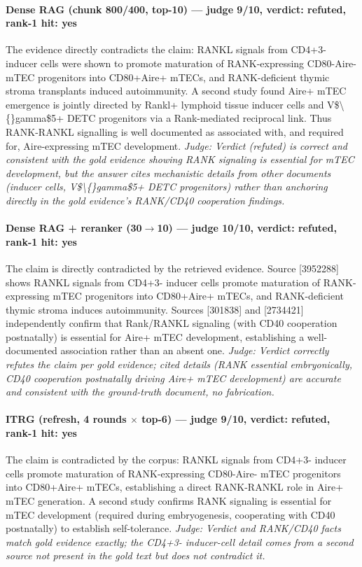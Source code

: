 \documentclass[sigconf, review, anonymous]{acmart}
\begin{document}
\paragraph{Dense RAG (chunk 800/400, top-10) --- judge 9/10, verdict: refuted, rank-1 hit: yes}
\noindent The evidence directly contradicts the claim: RANKL signals from CD4+3- inducer cells were shown to promote maturation of RANK-expressing CD80-Aire- mTEC progenitors into CD80+Aire+ mTECs, and RANK-deficient thymic stroma transplants induced autoimmunity. A second study found Aire+ mTEC emergence is jointly directed by Rankl+ lymphoid tissue inducer cells and V\$\textbackslash\{\}gamma\$5+ DETC progenitors via a Rank-mediated reciprocal link. Thus RANK-RANKL signalling is well documented as associated with, and required for, Aire-expressing mTEC development.
\noindent\small\textit{Judge: Verdict (refuted) is correct and consistent with the gold evidence showing RANK signaling is essential for mTEC development, but the answer cites mechanistic details from other documents (inducer cells, V\$\textbackslash\{\}gamma\$5+ DETC progenitors) rather than anchoring directly in the gold evidence's RANK/CD40 cooperation findings.}
\paragraph{Dense RAG + reranker (30$\to$10) --- judge 10/10, verdict: refuted, rank-1 hit: yes}
\noindent The claim is directly contradicted by the retrieved evidence. Source [3952288] shows RANKL signals from CD4+3- inducer cells promote maturation of RANK-expressing mTEC progenitors into CD80+Aire+ mTECs, and RANK-deficient thymic stroma induces autoimmunity. Sources [301838] and [2734421] independently confirm that Rank/RANKL signaling (with CD40 cooperation postnatally) is essential for Aire+ mTEC development, establishing a well-documented association rather than an absent one.
\noindent\small\textit{Judge: Verdict correctly refutes the claim per gold evidence; cited details (RANK essential embryonically, CD40 cooperation postnatally driving Aire+ mTEC development) are accurate and consistent with the ground-truth document, no fabrication.}
\paragraph{ITRG (refresh, 4 rounds $\times$ top-6) --- judge 9/10, verdict: refuted, rank-1 hit: yes}
\noindent The claim is contradicted by the corpus: RANKL signals from CD4+3- inducer cells promote maturation of RANK-expressing CD80-Aire- mTEC progenitors into CD80+Aire+ mTECs, establishing a direct RANK-RANKL role in Aire+ mTEC generation. A second study confirms RANK signaling is essential for mTEC development (required during embryogenesis, cooperating with CD40 postnatally) to establish self-tolerance.
\noindent\small\textit{Judge: Verdict and RANK/CD40 facts match gold evidence exactly; the CD4+3- inducer-cell detail comes from a second source not present in the gold text but does not contradict it.}
\end{document}
